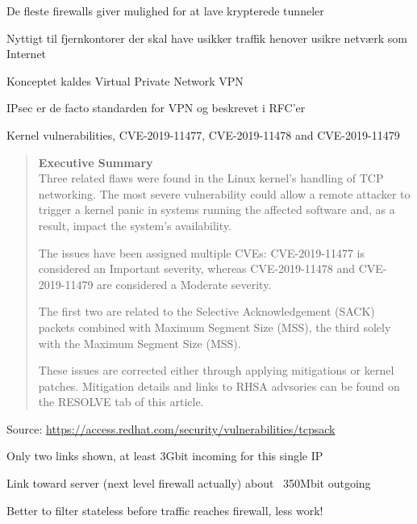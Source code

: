 \documentclass[Screen16to9,17pt]{foils}
\begin{document}
\begin{list1}
\item De fleste firewalls giver mulighed for at lave krypterede
  tunneler
\item Nyttigt til fjernkontorer der skal have usikker traffik henover
  usikre netværk som Internet
\item Konceptet kaldes Virtual Private Network VPN
\item IPsec er de facto standarden for VPN og beskrevet i RFC'er
\end{list1}




Kernel vulnerabilities, CVE-2019-11477, CVE-2019-11478 and CVE-2019-11479

\begin{quote}\footnotesize{\bf
Executive Summary}\\
Three related flaws were found in the Linux kernel’s handling of TCP networking.  The most severe vulnerability could allow a remote attacker to trigger a kernel panic in systems running the affected software and, as a result, impact the system’s availability.

The issues have been assigned multiple CVEs: CVE-2019-11477 is considered an Important severity, whereas CVE-2019-11478 and CVE-2019-11479 are considered a Moderate severity.

The first two are related to the Selective Acknowledgement (SACK) packets combined with Maximum Segment Size (MSS), the third solely with the Maximum Segment Size (MSS).

These issues are corrected either through applying mitigations or kernel patches.  Mitigation details and links to RHSA advsories can be found on the RESOLVE tab of this article.
\end{quote}

Source: {\footnotesize\url{https://access.redhat.com/security/vulnerabilities/tcpsack}}



\centerline{Only two links shown, at least 3Gbit incoming for this single IP}

\centerline{Link toward server (next level firewall actually) about ~350Mbit outgoing}

Better to filter stateless before traffic reaches firewall, less work!
\end{document}
